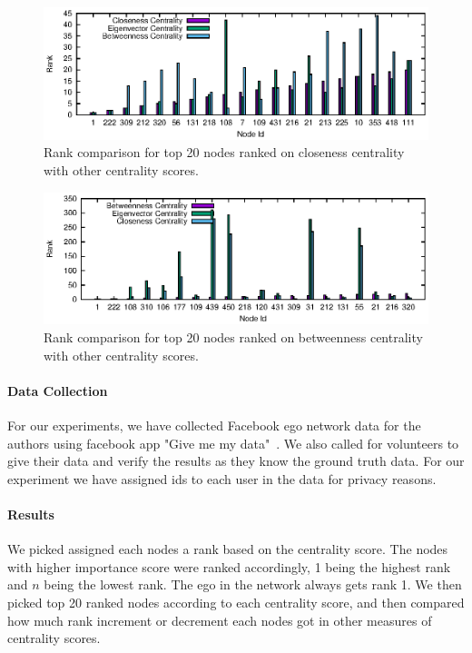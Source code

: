 \begin{figure}[ht]
    \centering
    \includegraphics[width=1\textwidth]{figures/social-result_closeness.eps}
    \caption{Rank comparison for top 20 nodes ranked on closeness centrality with other centrality scores.}
    \label{fig:social-result-closeness}
\end{figure}

\begin{figure}[ht]
    \centering
    \includegraphics[width=1\textwidth]{figures/social-result_betweenness.eps}
    \caption{Rank comparison for top 20 nodes ranked on betweenness centrality with other centrality scores.}
    \label{fig:social-result-betweenness}
\end{figure}

\paragraph{Data Collection}
For our experiments, we have collected Facebook ego network data for
the authors using facebook app "Give me my data"~\cite{givememydata}.
We also called for volunteers to give their data and verify the
results as they know the ground truth data.  For our experiment we
have assigned ids to each user in the data for privacy reasons. 

\paragraph{Results}
We picked assigned each nodes a rank based on the centrality score.
The nodes with higher importance score were ranked accordingly, 1
being the highest rank and $n$ being the lowest rank.  The ego in the
network always gets rank 1.  We then picked top 20 ranked nodes
according to each centrality score, and then compared how much rank
increment or decrement each nodes got in other measures of centrality
scores.

